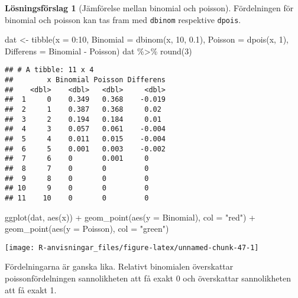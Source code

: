 \documentclass[
]{book}
\newenvironment{Shaded}{\begin{snugshade}}{\end{snugshade}}
\newcommand{\AttributeTok}[1]{\textcolor[rgb]{0.77,0.63,0.00}{#1}}
\newcommand{\DecValTok}[1]{\textcolor[rgb]{0.00,0.00,0.81}{#1}}
\newcommand{\FloatTok}[1]{\textcolor[rgb]{0.00,0.00,0.81}{#1}}
\newcommand{\FunctionTok}[1]{\textcolor[rgb]{0.00,0.00,0.00}{#1}}
\newcommand{\NormalTok}[1]{#1}
\newcommand{\OtherTok}[1]{\textcolor[rgb]{0.56,0.35,0.01}{#1}}
\newcommand{\SpecialCharTok}[1]{\textcolor[rgb]{0.00,0.00,0.00}{#1}}
\newcommand{\StringTok}[1]{\textcolor[rgb]{0.31,0.60,0.02}{#1}}
\theoremstyle{definition}
\theoremstyle{definition}
\theoremstyle{definition}
\theoremstyle{definition}
\newtheorem{hypothesis}{Lösningsförslag}[chapter]
\theoremstyle{remark}
\begin{document}
\begin{hypothesis}[Jämförelse mellan binomial och poisson]
Fördelningen för binomial och poisson kan tas fram med \texttt{dbinom} respektive \texttt{dpois}.

\begin{Shaded}
\begin{Highlighting}[]
\NormalTok{dat }\OtherTok{\textless{}{-}} \FunctionTok{tibble}\NormalTok{(}\AttributeTok{x =} \DecValTok{0}\SpecialCharTok{:}\DecValTok{10}\NormalTok{,}
              \AttributeTok{Binomial =} \FunctionTok{dbinom}\NormalTok{(x, }\DecValTok{10}\NormalTok{, }\FloatTok{0.1}\NormalTok{),}
              \AttributeTok{Poisson =} \FunctionTok{dpois}\NormalTok{(x, }\DecValTok{1}\NormalTok{),}
              \AttributeTok{Differens =}\NormalTok{ Binomial }\SpecialCharTok{{-}}\NormalTok{ Poisson)}
\NormalTok{dat }\SpecialCharTok{\%\textgreater{}\%} \FunctionTok{round}\NormalTok{(}\DecValTok{3}\NormalTok{)}
\end{Highlighting}
\end{Shaded}

\begin{verbatim}
## # A tibble: 11 x 4
##        x Binomial Poisson Differens
##    <dbl>    <dbl>   <dbl>     <dbl>
##  1     0    0.349   0.368    -0.019
##  2     1    0.387   0.368     0.02 
##  3     2    0.194   0.184     0.01 
##  4     3    0.057   0.061    -0.004
##  5     4    0.011   0.015    -0.004
##  6     5    0.001   0.003    -0.002
##  7     6    0       0.001     0    
##  8     7    0       0         0    
##  9     8    0       0         0    
## 10     9    0       0         0    
## 11    10    0       0         0
\end{verbatim}

\begin{Shaded}
\begin{Highlighting}[]
\FunctionTok{ggplot}\NormalTok{(dat, }\FunctionTok{aes}\NormalTok{(x)) }\SpecialCharTok{+}
  \FunctionTok{geom\_point}\NormalTok{(}\FunctionTok{aes}\NormalTok{(}\AttributeTok{y =}\NormalTok{ Binomial), }\AttributeTok{col =} \StringTok{"red"}\NormalTok{) }\SpecialCharTok{+}
  \FunctionTok{geom\_point}\NormalTok{(}\FunctionTok{aes}\NormalTok{(}\AttributeTok{y =}\NormalTok{ Poisson), }\AttributeTok{col =} \StringTok{"green"}\NormalTok{)}
\end{Highlighting}
\end{Shaded}

\begin{center}\texttt{[image: R-anvisningar\_files/figure-latex/unnamed-chunk-47-1]} \end{center}

Fördelningarna är ganska lika. Relativt binomialen överskattar poissonfördelningen sannolikheten att få exakt 0 och överskattar sannolikheten att få exakt 1.
\end{hypothesis}
\end{document}
